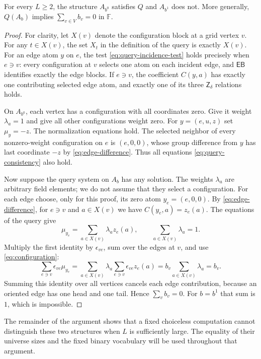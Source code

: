 \begin{proposition}\label{prop:opposite-answers}
For every $L\ge2$, the structure $A_{b^0}$ satisfies $Q$ and
$A_{b^1}$ does not.  More generally, $Q(A_b)$ implies
$\sum_{v\in V}b_v=0$ in $\mathbb F$.
\end{proposition}
\begin{proof}
For clarity, let $X(v)$ denote the configuration block at a grid vertex
$v$.  For any $t\in X(v)$, the set $X_t$ in the definition of the query is
exactly $X(v)$.  For an edge atom $y$ on $e$, the test
\eqref{eq:query-incidence-test} holds precisely when $e\ni v$: every
configuration at $v$ selects one atom on each incident edge, and
$\mathsf{EB}$ identifies exactly the edge blocks.  If $e\ni v$, the
coefficient $C(y,a)$ has exactly one contributing selected edge atom,
and exactly one of its three $\mathsf Z_\delta$ relations holds.

On $A_{b^0}$, each vertex has a configuration with all coordinates zero.
Give it weight $\lambda_a=1$ and give all other configurations weight zero.
For $y=(e,u,z)$ set $\mu_y=-z$.  The normalization equations hold.
The selected neighbor of every nonzero-weight configuration on $e$ is
$(e,0,0)$, whose group difference from $y$ has last coordinate $-z$ by
\eqref{eq:edge-difference}.  Thus all equations
\eqref{eq:query-consistency} also hold.

Now suppose the query system on $A_b$ has any solution.  The weights
$\lambda_a$ are arbitrary field elements; we do not assume that they
select a configuration.  For each edge choose, only for this proof, its
zero atom $y_e=(e,0,0)$.  By \eqref{eq:edge-difference}, for $e\ni v$ and
$a\in X(v)$ we have $C(y_e,a)=z_e(a)$.  The equations of the query give
\[
 \mu_{y_e}=\sum_{a\in X(v)}\lambda_a z_e(a),\qquad
 \sum_{a\in X(v)}\lambda_a=1.
\]
Multiply the first identity by $\epsilon_{ve}$, sum over the edges at
$v$, and use \eqref{eq:configuration}:
\[
 \sum_{e\ni v}\epsilon_{ve}\mu_{y_e}
 =\sum_{a\in X(v)}\lambda_a
       \sum_{e\ni v}\epsilon_{ve}z_e(a)
 =b_v\sum_{a\in X(v)}\lambda_a=b_v.
\]
Summing this identity over all vertices cancels each edge contribution,
because an oriented edge has one head and one tail.  Hence
$\sum_v b_v=0$.  For $b=b^1$ that sum is $1$, which is impossible.
\end{proof}

The remainder of the argument shows that a fixed choiceless computation
cannot distinguish these two structures when $L$ is sufficiently large.
The equality of their universe sizes and the fixed binary vocabulary
will be used throughout that argument.
